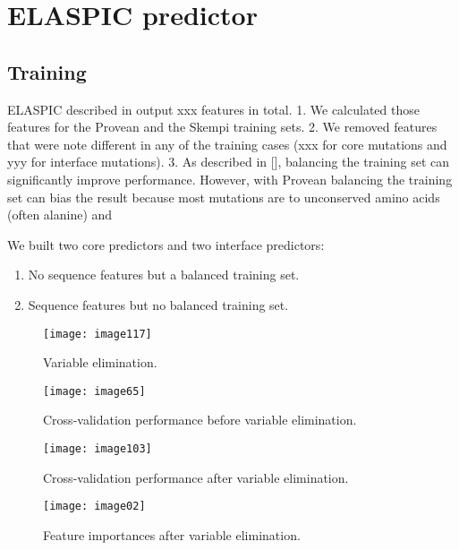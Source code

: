 
\section{ELASPIC predictor}

\subsection{Training}

ELASPIC described in  output xxx features in total. 
1. We calculated those features for the Provean and the Skempi training sets. 
2. We removed features that were note different in any of the training cases (xxx for core mutations and yyy for interface mutations).
3. As described in [], balancing the training set can significantly improve performance. However, with Provean balancing the training set can bias the result because most mutations are to unconserved amino acids (often alanine) and 



We built two core predictors and two interface predictors:

\begin{enumerate}
	\item No sequence features but a balanced training set.
	\item Sequence features but no balanced training set.
\end{enumerate}


\begin{figure}[H]
	\centering
	\texttt{[image: image117]}
	\caption{Variable elimination.}
\end{figure}

\begin{figure}[H]
	\centering
	\texttt{[image: image65]}
	\caption{Cross-validation performance before variable elimination.}
\end{figure}

\begin{figure}[H]
	\centering
	\texttt{[image: image103]}
	\caption{Cross-validation performance after variable elimination.}
\end{figure}

\begin{figure}[H]
	\centering
	\texttt{[image: image02]}
	\caption{Feature importances after variable elimination.}
\end{figure}




